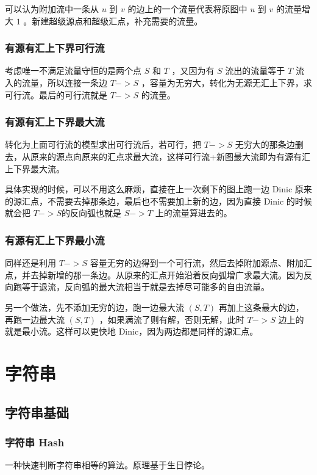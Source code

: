 \documentclass[UTF-8]{ctexart}
\begin{document}
			可以认为附加流中一条从  $u$ 到 $v$ 的边上的一个流量代表将原图中 $u$ 到 $v$ 的流量增大 $1$ 。新建超级源点和超级汇点，补充需要的流量。
		
			\subsubsection{有源有汇上下界可行流}
			
			考虑唯一不满足流量守恒的是两个点 $S$ 和 $T$ ，又因为有 $S$ 流出的流量等于 $T$ 流入的流量，所以连接一条边 $T->S$ ，容量为无穷大，转化为无源无汇上下界，求可行流。最后的可行流就是 $T->S$ 的流量。
			
			\subsubsection{有源有汇上下界最大流}
			
			转化为上面可行流的模型求出可行流后，若可行，把 $T->S$ 无穷大的那条边删去，从原来的源点向原来的汇点求最大流，这样可行流+新图最大流即为有源有汇上下界最大流。  
			
			具体实现的时候，可以不用这么麻烦，直接在上一次剩下的图上跑一边 Dinic 原来的源汇点，不需要去掉那条边，最后也不需要加上新的边，因为直接 Dinic 的时候就会把 $T->S$的反向弧也就是 $S->T$ 上的流量算进去的。
			
			\subsubsection{有源有汇上下界最小流}
			
			同样还是利用 $T->S$ 容量无穷的边得到一个可行流，然后去掉附加源点、附加汇点，并去掉新增的那一条边。从原来的汇点开始沿着反向弧增广求最大流。因为反向跑等于退流，反向弧的最大流相当于就是去掉尽可能多的自由流量。  
			
			另一个做法，先不添加无穷的边，跑一边最大流 $(S,T)$ 再加上这条最大的边，再跑一边最大流 $(S,T)$ ，如果满流了则有解，否则无解，此时 $T->S$ 边上的就是最小流。这样可以更快地 Dinic，因为两边都是同样的源汇点。
	\newpage
	\section{字符串}
		\subsection{字符串基础}
			\subsubsection{字符串 Hash}
			一种快速判断字符串相等的算法。原理基于生日悖论。
	
\end{document}
